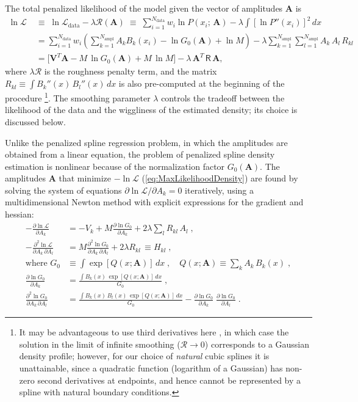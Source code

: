 \documentclass[12pt]{article}
\renewcommand{\d}{\partial}
\newcommand{\bA}{\boldsymbol{A}}
\begin{document}
The total penalized likelihood of the model given the vector of amplitudes $\bA$ is
\begin{align}
\ln\mathcal{L}\; &\equiv\; \ln\mathcal{L}_\mathrm{data} - \lambda \mathcal{R}(\bA) \;\equiv\;
\sum_{i=1}^{N_\mathrm{data}}  w_i  \ln P(x_i;\,\bA) - \lambda \int \left[\ln P''(x_i)\right]^2 \,dx \nonumber \\
&= \sum_{i=1}^{N_\mathrm{data}} w_i \left(\sum_{k=1}^{N_\mathrm{ampl}} A_k B_k(x_i) - \ln G_0(\bA) + \ln M \right) - \lambda \sum_{k=1}^{N_\mathrm{ampl}} \sum_{l=1}^{N_\mathrm{ampl}} A_k\,A_l\,R_{kl}  \nonumber\\
&= \big[ \boldsymbol{V}^T\bA - M\, \ln G_0(\bA)  + M\, \ln M \big] - \lambda\,\bA^T\,\mathsf{R}\,\bA ,
\label{eq:MaxLikelihoodDensity}
\end{align}
where $\lambda \mathcal{R}$ is the roughness penalty term, and the matrix $R_{kl}\equiv \int B_k''(x)\,B_l''(x)\,dx$ is also pre-computed at the beginning of the procedure%
\footnote{It may be advantageous to use third derivatives here \cite{Silverman1982}, in which case the solution in the limit of infinite smoothing ($\mathcal{R}\to 0$) corresponds to a Gaussian density profile; however, for our choice of \textit{natural} cubic splines it is unattainable, since a quadratic function (logarithm of a Gaussian) has non-zero second derivatives at endpoints, and hence cannot be represented by a spline with natural boundary conditions.}.
The smoothing parameter $\lambda$ controls the tradeoff between the likelihood of the data and the wiggliness of the estimated density; its choice is discussed below.

Unlike the penalized spline regression problem, in which the amplitudes are obtained from a linear equation, the problem of penalized spline density estimation is nonlinear because of the normalization factor $G_0(\bA)$. The amplitudes $\bA$ that minimize $-\!\ln\mathcal{L}$ (\ref{eq:MaxLikelihoodDensity}) are found by solving the system of equations $\d \ln\mathcal{L}/\d A_k=0$ iteratively, using a multidimensional Newton method with explicit expressions for the gradient and hessian:
\begin{subequations}
\begin{align}
-\frac{\d \ln\mathcal{L}}{\d A_k} &= -V_k + M \frac{\d \ln G_0}{\d A_k} + 2\lambda \sum_l R_{kl}\,A_l \;, \label{eq:lnLgrad} \\
-\frac{\d^2 \ln\mathcal{L}}{\d A_k\, \d A_l} &= M \frac{\d^2 \ln G_0}{\d A_k\, \d A_l} + 2\lambda R_{kl} \,\equiv H_{kl}\;, \\
\mbox{where }G_0 &\equiv \int \exp[Q(x; \bA)]\,dx \;, \quad
Q(x; \bA) \equiv \sum_k  A_k\, B_k(x) \;, \nonumber \\
\frac{\d \ln G_0}{\d A_k} &= \frac{\int B_k(x)\,\exp[Q(x; \bA)]\,dx}{G_0} \;, \nonumber\\
\frac{\d^2 \ln G_0}{\d A_k\, \d A_l} &= \frac{\int B_k(x)\,B_l(x)\,\exp[Q(x; \bA)]\,dx}{G_0} - \frac{\d \ln G_0}{\d A_k}\; \frac{\d \ln G_0}{\d A_l} \;. \nonumber
\end{align}
\end{subequations}
\end{document}
